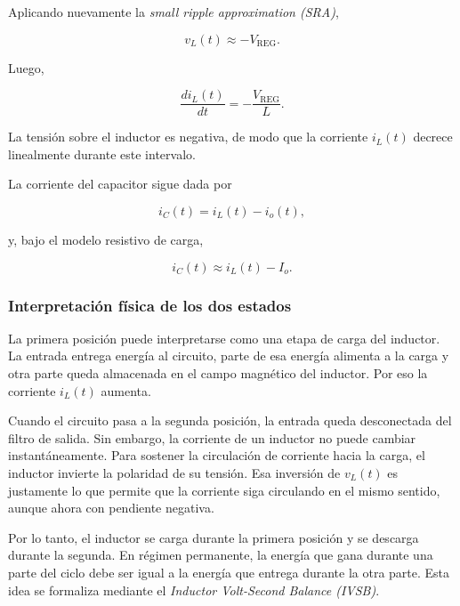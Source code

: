 \documentclass[a4paper,12pt]{article}
\begin{document}
Aplicando nuevamente la \textit{small ripple approximation (SRA)},

\begin{equation}
    v_L(t) \approx -V_\text{REG}.
\end{equation}

Luego,

\begin{equation}
    \frac{di_L(t)}{dt} = -\frac{V_\text{REG}}{L}.
\end{equation}

La tensión sobre el inductor es negativa, de modo que la corriente $i_L(t)$ decrece linealmente durante este intervalo.

La corriente del capacitor sigue dada por

\begin{equation}
    i_C(t) = i_L(t) - i_o(t),
\end{equation}

y, bajo el modelo resistivo de carga,

\begin{equation}
    i_C(t) \approx i_L(t) - I_o.
\end{equation}

\subsubsection{Interpretación física de los dos estados}

La primera posición puede interpretarse como una etapa de carga del inductor. La entrada entrega energía al circuito, parte de esa energía alimenta a la carga y otra parte queda almacenada en el campo magnético del inductor. Por eso la corriente $i_L(t)$ aumenta.

Cuando el circuito pasa a la segunda posición, la entrada queda desconectada del filtro de salida. Sin embargo, la corriente de un inductor no puede cambiar instantáneamente. Para sostener la circulación de corriente hacia la carga, el inductor invierte la polaridad de su tensión. Esa inversión de $v_L(t)$ es justamente lo que permite que la corriente siga circulando en el mismo sentido, aunque ahora con pendiente negativa.

Por lo tanto, el inductor se carga durante la primera posición y se descarga durante la segunda. En régimen permanente, la energía que gana durante una parte del ciclo debe ser igual a la energía que entrega durante la otra parte. Esta idea se formaliza mediante el \textit{Inductor Volt-Second Balance (IVSB)}.
\end{document}
